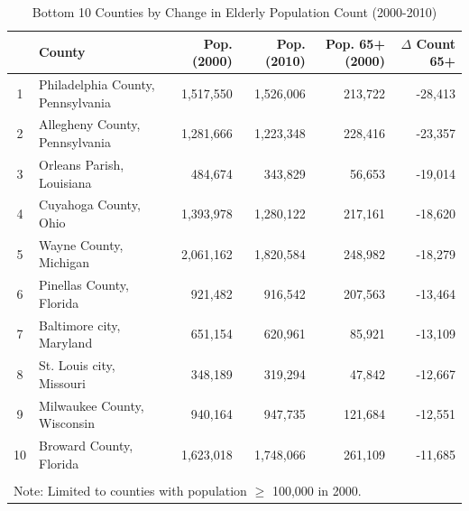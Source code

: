 \begin{table}[htbp]
\caption{Bottom 10 Counties by Change in Elderly Population Count (2000-2010)}
\label{tab:bottom10_elderly_count_change}
\begin{tabular}{clrrrr}
\toprule
 & County & Pop. (2000) & Pop. (2010) & Pop. 65+ (2000) & $\Delta$ Count 65+ \\
\midrule
1 & Philadelphia County, Pennsylvania & 1,517,550 & 1,526,006 & 213,722 & -28,413 \\
2 & Allegheny County, Pennsylvania & 1,281,666 & 1,223,348 & 228,416 & -23,357 \\
3 & Orleans Parish, Louisiana & 484,674 & 343,829 & 56,653 & -19,014 \\
4 & Cuyahoga County, Ohio & 1,393,978 & 1,280,122 & 217,161 & -18,620 \\
5 & Wayne County, Michigan & 2,061,162 & 1,820,584 & 248,982 & -18,279 \\
6 & Pinellas County, Florida & 921,482 & 916,542 & 207,563 & -13,464 \\
7 & Baltimore city, Maryland & 651,154 & 620,961 & 85,921 & -13,109 \\
8 & St. Louis city, Missouri & 348,189 & 319,294 & 47,842 & -12,667 \\
9 & Milwaukee County, Wisconsin & 940,164 & 947,735 & 121,684 & -12,551 \\
10 & Broward County, Florida & 1,623,018 & 1,748,066 & 261,109 & -11,685 \\
\bottomrule
\\
\multicolumn{6}{l}{\footnotesize Note: Limited to counties with population $\geq$ 100,000 in 2000.} \\
\end{tabular}
\end{table}
